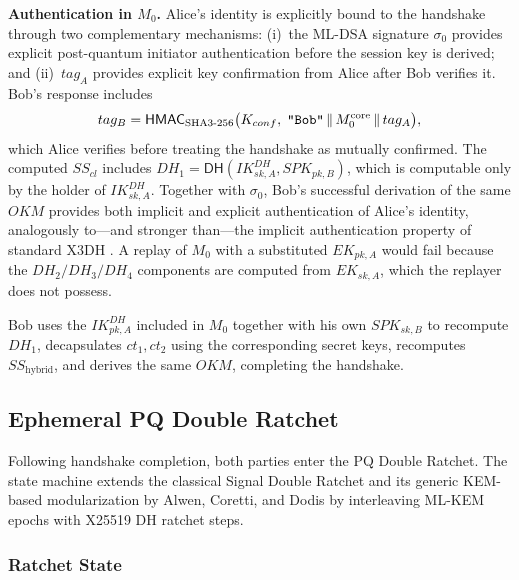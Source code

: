 \documentclass[11pt,a4paper]{article}
\theoremstyle{remark}
\theoremstyle{plain}
\newcommand{\DHop}{\mathsf{DH}}
\newcommand{\HMAC}{\mathsf{HMAC}}
\newcommand{\strlit}[1]{\text{\upshape\texttt{"#1"}}}
\begin{document}
\noindent\textbf{Authentication in $M_0$.}  Alice's identity is explicitly bound to
the handshake through two complementary mechanisms: (i)~the ML-DSA signature
$\sigma_0$ provides explicit post-quantum initiator authentication before the session
key is derived; and (ii)~$tag_A$ provides explicit key confirmation from Alice after
Bob verifies it. Bob's response includes
\[
      tag_B = \HMAC_{\mathrm{SHA3\text{-}256}}\bigl(K_{conf},\; \strlit{Bob} \,\|\, M_0^{\mathrm{core}} \,\|\, tag_A\bigr),
\]
which Alice verifies before treating the handshake as mutually confirmed.
The computed $SS_{cl}$ includes $DH_1 = \DHop(IK^{DH}_{sk,A}, SPK_{pk,B})$, which is computable
only by the holder of $IK^{DH}_{sk,A}$.  Together with $\sigma_0$, Bob's successful derivation of
the same $OKM$ provides both implicit and explicit authentication of Alice's identity,
analogously to---and stronger than---the implicit authentication property
of standard X3DH \cite{marlinspike_x3dh}.  A replay of $M_0$ with a substituted $EK_{pk,A}$
would fail because the $DH_2/DH_3/DH_4$ components are computed from $EK_{sk,A}$, which the
replayer does not possess.

Bob uses the $IK^{DH}_{pk,A}$ included in $M_0$ together with his own $SPK_{sk,B}$ to recompute
$DH_1$, decapsulates $ct_1, ct_2$ using the corresponding secret keys, recomputes
$SS_{\text{hybrid}}$, and derives the same $OKM$, completing the handshake.

\subsection{Ephemeral PQ Double Ratchet}
\label{sec:ratchet}

Following handshake completion, both parties enter the PQ Double Ratchet.  The state machine
extends the classical Signal Double Ratchet \cite{marlinspike_ratchet} and its generic KEM-based
modularization by Alwen, Coretti, and Dodis \cite{alwen2019doubleratchet} by interleaving ML-KEM
epochs with X25519 DH ratchet steps.

\subsubsection{Ratchet State}
\end{document}
